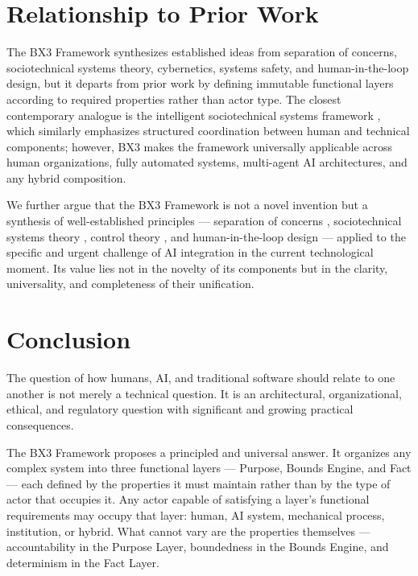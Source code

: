 \documentclass[12pt]{article}
\theoremstyle{plain}
\begin{document}
\section{Relationship to Prior Work}
\label{sec:prior}

The BX3 Framework synthesizes established ideas from separation of concerns, sociotechnical systems theory, cybernetics, systems safety, and human-in-the-loop design, but it departs from prior work by defining immutable functional layers according to required properties rather than actor type. The closest contemporary analogue is the intelligent sociotechnical systems framework \cite{xu2024}, which similarly emphasizes structured coordination between human and technical components; however, BX3 makes the framework universally applicable across human organizations, fully automated systems, multi-agent AI architectures, and any hybrid composition.

We further argue that the BX3 Framework is not a novel invention but a synthesis of well-established principles --- separation of concerns \cite{dijkstra1982}, sociotechnical systems theory \cite{trist1981}, control theory \cite{wiener1948}, and human-in-the-loop design \cite{bansal2019} --- applied to the specific and urgent challenge of AI integration in the current technological moment. Its value lies not in the novelty of its components but in the clarity, universality, and completeness of their unification.

\section{Conclusion}
\label{sec:conclusion}

The question of how humans, AI, and traditional software should relate to one another is not merely a technical question. It is an architectural, organizational, ethical, and regulatory question with significant and growing practical consequences.

The BX3 Framework proposes a principled and universal answer. It organizes any complex system into three functional layers --- Purpose, Bounds Engine, and Fact --- each defined by the properties it must maintain rather than by the type of actor that occupies it. Any actor capable of satisfying a layer's functional requirements may occupy that layer: human, AI system, mechanical process, institution, or hybrid. What cannot vary are the properties themselves --- accountability in the Purpose Layer, boundedness in the Bounds Engine, and determinism in the Fact Layer.
\end{document}

